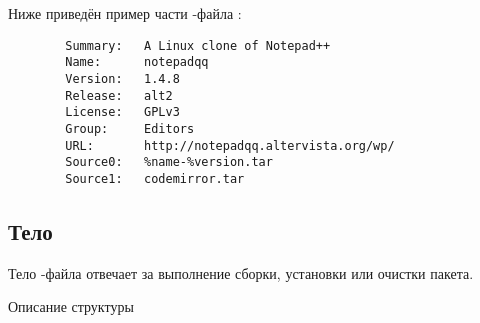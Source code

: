 Ниже приведён пример части -файла :
\begin{verbatim}
        Summary:   A Linux clone of Notepad++
        Name:      notepadqq
        Version:   1.4.8
        Release:   alt2
        License:   GPLv3
        Group:     Editors
        URL:       http://notepadqq.altervista.org/wp/
        Source0:   %name-%version.tar
        Source1:   codemirror.tar
\end{verbatim}

\subsection*{Тело}

Тело -файла отвечает за выполнение сборки, установки или очистки пакета.

Описание структуры%
